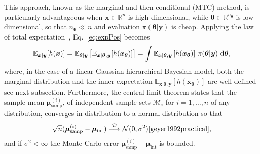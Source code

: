 This approach, known as the marginal and then conditional (MTC) method, is particularly advantageous when $\bm{x}\in \mathbb{R}^n$ is high-dimensional, while $\bm{\theta}\in \mathbb{R}^{n_{\bm{\theta}}}$ is low-dimensional, so that $n_{\bm{\theta}} \ll n$ and evaluation $\pi(\bm{\theta}| \bm{y})$ is cheap.
Applying the law of total expectation~\cite{champ2022generalizedlawtotalcovariance}, Eq.~\eqref{eq:expPos} becomes
\begin{align}
	\mathbb{E}_{\bm{x} |  \bm{y}} [h(\bm{x})] 
	= \mathbb{E}_{\bm{\theta} |  \bm{y}} \left[ \mathbb{E}_{\bm{x} |  \bm{\theta}, \bm{y}} [h(\bm{x}_{\bm{\theta}})] \right] 
	= \int \mathbb{E}_{\bm{x} |  \bm{\theta}, \bm{y}} \left[ h(\bm{x}_{\bm{\theta}}) \right] \, \pi(\bm{\theta} |  \bm{y}) \, \mathop{}\!\mathrm{d} \bm{\theta},
	\label{eq:fullCond}
\end{align}
where, in the case of a linear-Gaussian hierarchical Bayesian model, both the marginal distribution and the inner expectation $\mathbb{E}_{\bm{x} |  \bm{\theta}, \bm{y}} \left[ h(\bm{x}_{\bm{\theta}}) \right]$ are well defined see next subsection.
Furthermore, the central limit theorem states that the sample mean $ \bm{\mu}^{(i)}_{\text{samp}} $, of independent sample sets $\mathcal{M}_i$ for $i = 1, \dots, n$ of any distribution, converges in distribution to a normal distribution so that
\begin{align}
	\sqrt{n} (\bm{\mu}^{(i)}_{\text{samp}} -  \bm{\mu}_{\text{int}} ) \overset{\mathcal{D}}{\longrightarrow} \mathcal{N} (0,\sigma^2) \text{\cite{geyer1992practical}},
\end{align}
and if $\sigma^2 < \infty$ the Monte-Carlo error $\bm{\mu}^{(i)}_{\text{samp}} -  \bm{\mu}_{\text{int}} $ is bounded.

